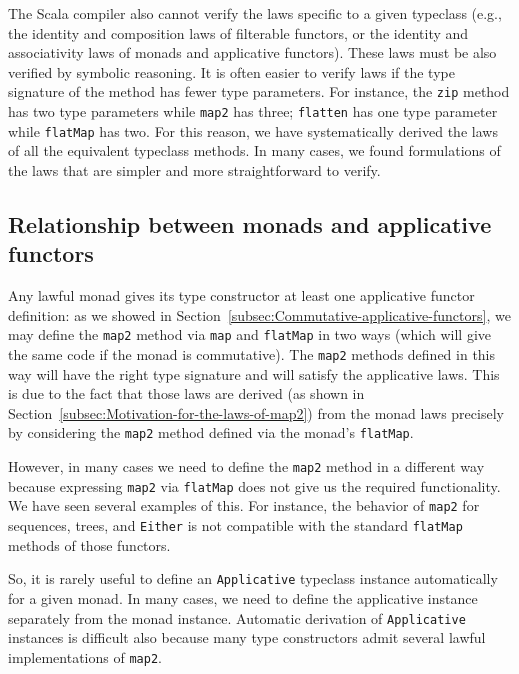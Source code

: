 The Scala compiler also cannot verify the laws specific to a given
typeclass (e.g., the identity and composition laws of filterable functors,
or the identity and associativity laws of monads and applicative functors).
These laws must be also verified by symbolic reasoning. It is often
easier to verify laws if the type signature of the method has fewer
type parameters. For instance, the \lstinline!zip! method has two
type parameters while \lstinline!map2! has three; \lstinline!flatten!
has one type parameter while \lstinline!flatMap! has two. For this
reason, we have systematically derived the laws of all the equivalent
typeclass methods. In many cases, we found formulations of the laws
that are simpler and more straightforward to verify. 

\subsection{Relationship between monads and applicative functors}

Any lawful monad gives its type constructor at least one applicative
functor definition: as we showed in Section~\ref{subsec:Commutative-applicative-functors},
we may define the \lstinline!map2! method via \lstinline!map! and
\lstinline!flatMap! in two ways (which will give the same code if
the monad is commutative). The \lstinline!map2! methods defined in
this way will have the right type signature and will satisfy the applicative
laws. This is due to the fact that those laws are derived (as shown
in Section~\ref{subsec:Motivation-for-the-laws-of-map2}) from the
monad laws precisely by considering the \lstinline!map2! method defined
via the monad\textsf{'}s \lstinline!flatMap!.

However, in many cases we need to define the \lstinline!map2! method
in a different way because expressing \lstinline!map2! via \lstinline!flatMap!
does not give us the required functionality. We have seen several
examples of this. For instance, the behavior of \lstinline!map2!
for sequences, trees, and \lstinline!Either! is not compatible with
the standard \lstinline!flatMap! methods of those functors.

So, it is rarely useful to define an \lstinline!Applicative! typeclass
instance automatically for a given monad. In many cases, we need to
define the applicative instance separately from the monad instance.
Automatic derivation of \lstinline!Applicative! instances is difficult
also because many type constructors admit several lawful implementations
of \lstinline!map2!.

